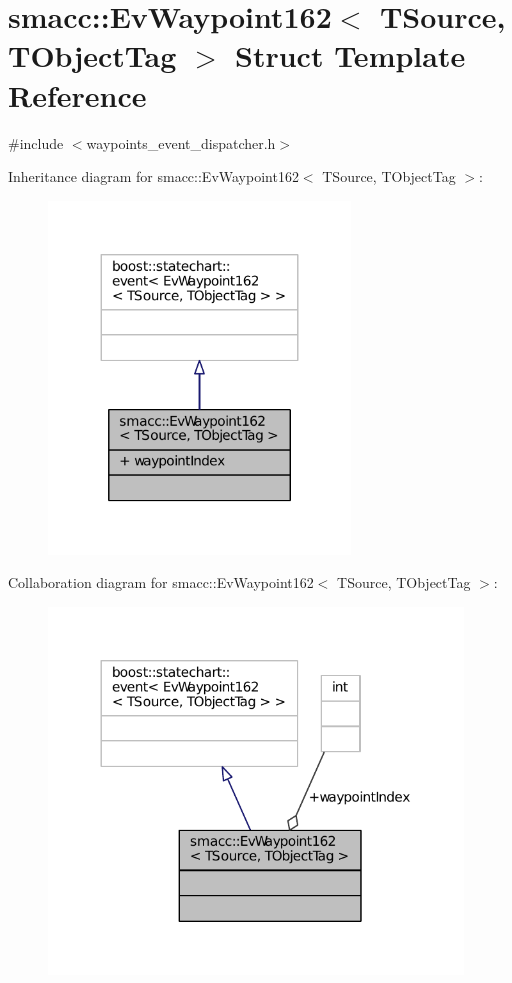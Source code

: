 \hypertarget{structsmacc_1_1EvWaypoint162}{}\section{smacc\+:\+:Ev\+Waypoint162$<$ T\+Source, T\+Object\+Tag $>$ Struct Template Reference}
\label{structsmacc_1_1EvWaypoint162}


{\ttfamily \#include $<$waypoints\+\_\+event\+\_\+dispatcher.\+h$>$}



Inheritance diagram for smacc\+:\+:Ev\+Waypoint162$<$ T\+Source, T\+Object\+Tag $>$\+:
\nopagebreak
\begin{figure}[H]
\begin{center}
\leavevmode
\includegraphics[width=227pt]{structsmacc_1_1EvWaypoint162__inherit__graph}
\end{center}
\end{figure}


Collaboration diagram for smacc\+:\+:Ev\+Waypoint162$<$ T\+Source, T\+Object\+Tag $>$\+:
\nopagebreak
\begin{figure}[H]
\begin{center}
\leavevmode
\includegraphics[width=312pt]{structsmacc_1_1EvWaypoint162__coll__graph}
\end{center}
\end{figure}

